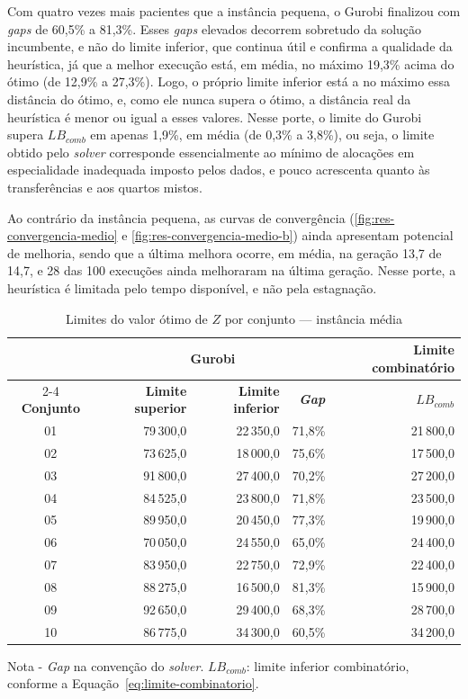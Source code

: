 Com quatro vezes mais pacientes que a instância pequena, o Gurobi finalizou com \textit{gaps} de 60,5\% a 81,3\%. Esses \textit{gaps} elevados decorrem sobretudo da solução incumbente, e não do limite inferior, que continua útil e confirma a qualidade da heurística, já que a melhor execução está, em média, no máximo 19,3\% acima do ótimo (de 12,9\% a 27,3\%). Logo, o próprio limite inferior está a no máximo essa distância do ótimo, e, como ele nunca supera o ótimo, a distância real da heurística é menor ou igual a esses valores. Nesse porte, o limite do Gurobi supera $LB_{comb}$ em apenas 1,9\%, em média (de 0,3\% a 3,8\%), ou seja, o limite obtido pelo \textit{solver} corresponde essencialmente ao mínimo de alocações em especialidade inadequada imposto pelos dados, e pouco acrescenta quanto às transferências e aos quartos mistos.

Ao contrário da instância pequena, as curvas de convergência (\autoref{fig:res-convergencia-medio} e \autoref{fig:res-convergencia-medio-b}) ainda apresentam potencial de melhoria, sendo que a última melhora ocorre, em média, na geração 13,7 de 14,7, e 28 das 100 execuções ainda melhoraram na última geração. Nesse porte, a heurística é limitada pelo tempo disponível, e não pela estagnação.

\begin{table}[H]
    \caption{Limites do valor ótimo de $Z$ por conjunto --- instância média}
    \label{tab:res-limites-medio}
    \centering
    \begin{tabular}{crrrr}
        \hline
        & \multicolumn{3}{c}{\textbf{Gurobi}} & \textbf{Limite combinatório} \\
        \cline{2-4} \cline{5-5}
        \textbf{Conjunto} & \textbf{Limite superior} & \textbf{Limite inferior} & \textbf{\textit{Gap}} & \textbf{$LB_{comb}$} \\
        \hline
        01 & 79\,300,0 & 22\,350,0 & 71,8\% & 21\,800,0 \\
        02 & 73\,625,0 & 18\,000,0 & 75,6\% & 17\,500,0 \\
        03 & 91\,800,0 & 27\,400,0 & 70,2\% & 27\,200,0 \\
        04 & 84\,525,0 & 23\,800,0 & 71,8\% & 23\,500,0 \\
        05 & 89\,950,0 & 20\,450,0 & 77,3\% & 19\,900,0 \\
        06 & 70\,050,0 & 24\,550,0 & 65,0\% & 24\,400,0 \\
        07 & 83\,950,0 & 22\,750,0 & 72,9\% & 22\,400,0 \\
        08 & 88\,275,0 & 16\,500,0 & 81,3\% & 15\,900,0 \\
        09 & 92\,650,0 & 29\,400,0 & 68,3\% & 28\,700,0 \\
        10 & 86\,775,0 & 34\,300,0 & 60,5\% & 34\,200,0 \\
        \hline
    \end{tabular}
    \par\smallskip
    {\footnotesize Nota - \textit{Gap} na convenção do \textit{solver}. $LB_{comb}$: limite inferior combinatório, conforme a Equação~\eqref{eq:limite-combinatorio}.}
\end{table}

